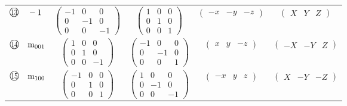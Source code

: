 \documentclass[fleqn,10pt,landscape]{jsarticle}
\begin{document}
\begin{center}
\begin{longtable}{lcccc}
$ {\ooalign{\hfil\resizebox{.8\width}{\height}{13}\hfil\crcr\raise.1ex\hbox{\large$\bigcirc$}}}\quad -1 $ & $ \begin{pmatrix} -1 & 0 & 0 \\ 0 & -1 & 0 \\ 0 & 0 & -1 \end{pmatrix} $ & $ \begin{pmatrix} 1 & 0 & 0 \\ 0 & 1 & 0 \\ 0 & 0 & 1 \end{pmatrix} $ & $ \begin{pmatrix} - x & - y & - z \end{pmatrix} $ & $ \begin{pmatrix} X & Y & Z \end{pmatrix} $ \\
$ {\ooalign{\hfil\resizebox{.8\width}{\height}{14}\hfil\crcr\raise.1ex\hbox{\large$\bigcirc$}}}\quad {\rm m}_{001} $ & $ \begin{pmatrix} 1 & 0 & 0 \\ 0 & 1 & 0 \\ 0 & 0 & -1 \end{pmatrix} $ & $ \begin{pmatrix} -1 & 0 & 0 \\ 0 & -1 & 0 \\ 0 & 0 & 1 \end{pmatrix} $ & $ \begin{pmatrix} x & y & - z \end{pmatrix} $ & $ \begin{pmatrix} - X & - Y & Z \end{pmatrix} $ \\
$ {\ooalign{\hfil\resizebox{.8\width}{\height}{15}\hfil\crcr\raise.1ex\hbox{\large$\bigcirc$}}}\quad {\rm m}_{100} $ & $ \begin{pmatrix} -1 & 0 & 0 \\ 0 & 1 & 0 \\ 0 & 0 & 1 \end{pmatrix} $ & $ \begin{pmatrix} 1 & 0 & 0 \\ 0 & -1 & 0 \\ 0 & 0 & -1 \end{pmatrix} $ & $ \begin{pmatrix} - x & y & z \end{pmatrix} $ & $ \begin{pmatrix} X & - Y & - Z \end{pmatrix} $ \\

\end{longtable}
\end{center}
\end{document}
